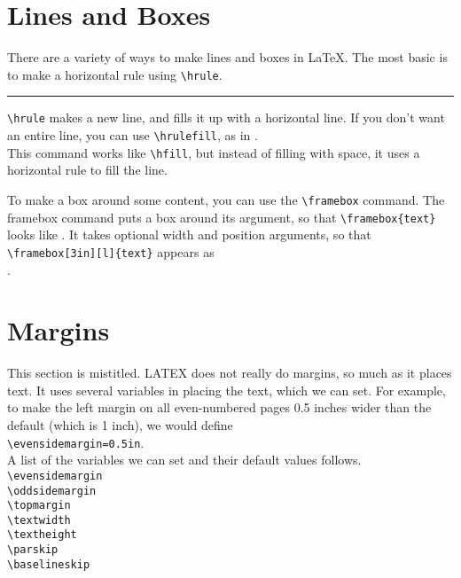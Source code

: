 \documentclass[a4paper,12pt]{extarticle}
\begin{document}
\section{Lines and Boxes}
There are a variety of ways to make lines and boxes in \LaTeX. The most
basic is to make a horizontal rule using \verb|\hrule|.\hrule
\newpage
\par
\verb|\hrule| makes a new line, and fills it up with a horizontal line. If you
don’t want an entire line, you can use \verb|\hrulefill|, as in \hrulefill .\\
This command works like \verb|\hfill|, but instead of filling with space, it uses a
horizontal rule to fill the line.
\par
To make a box around some content, you can use the \verb|\framebox| command. The framebox command puts a box around its argument, so that
\verb|\framebox{text}| looks like . It takes optional width and position arguments, so that \verb|\framebox[3in][l]{text}| appears as\\
.

\section{Margins}
This section is mistitled. LATEX does not really do margins, so much as it
places text. It uses several variables in placing the text, which we can set.
For example, to make the left margin on all even-numbered pages 0.5 inches
wider than the default (which is 1 inch), we would define\\
\verb|\evensidemargin=0.5in|.\\
A list of the variables we can set and their default values follows. 
\medskip              \\
\verb|\evensidemargin|\\
\verb|\oddsidemargin| \\
\verb|\topmargin|     \\
\verb|\textwidth|     \\
\verb|\textheight|    \\
\verb|\parskip|       \\
\verb|\baselineskip|  \\
\end{document}
